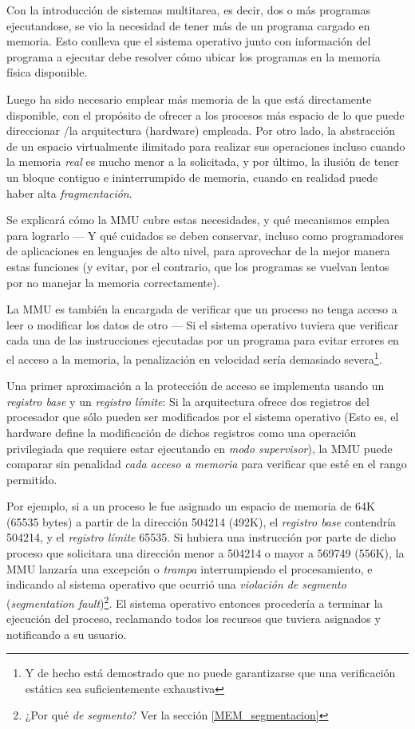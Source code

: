 \documentclass[11pt,fleqn]{book} %
\begin{document}
Con la introducción de sistemas multitarea, es decir, dos o más 
programas ejecutandose, se vio la necesidad de tener más de un
programa cargado en memoria. Esto conlleva que el sistema operativo
junto con información del programa a ejecutar debe resolver cómo
ubicar los programas en la memoria física disponible.

Luego ha sido necesario emplear más memoria de la que está directamente disponible, 
con el propósito de ofrecer a los procesos más espacio de lo que puede 
direccionar /la arquitectura (hardware) empleada. Por otro lado, 
la abstracción de un espacio virtualmente ilimitado para realizar sus
operaciones incluso cuando la memoria \emph{real} es mucho menor a la
solicitada, y por último, la ilusión de tener un bloque contiguo e
ininterrumpido de memoria, cuando en realidad puede haber alta
\emph{fragmentación}.

Se explicará cómo la MMU cubre estas necesidades, y qué mecanismos
emplea para lograrlo — Y qué cuidados se deben conservar, incluso como
programadores de aplicaciones en lenguajes de alto nivel, para aprovechar de la
mejor manera estas funciones (y evitar, por el contrario, que los
programas se vuelvan lentos por no manejar la memoria
correctamente).

La MMU es también la encargada de verificar que un proceso no tenga
acceso a leer o modificar los datos de otro — Si el sistema operativo
tuviera que verificar cada una de las instrucciones ejecutadas por
un programa para evitar errores en el acceso a la memoria, la 
penalización en velocidad sería demasiado severa\footnote{Y de hecho está 
demostrado que no puede garantizarse que una verificación estática sea
suficientemente exhaustiva }.

Una primer aproximación a la protección de acceso se implementa usando
un \emph{registro base} y un \emph{registro límite}: Si la arquitectura ofrece dos
registros del procesador que sólo pueden ser modificados por el
sistema operativo (Esto es, el hardware define la modificación de
dichos registros como una operación privilegiada que requiere estar
ejecutando en \emph{modo supervisor}), la MMU puede comparar sin penalidad \emph{cada  acceso a memoria} para verificar que esté en el rango permitido.

Por ejemplo, si a un proceso le fue asignado un espacio de memoria de
64K (65535 bytes) a partir de la dirección 504214 (492K), el \emph{registro base} contendría 504214, y el \emph{registro límite} 65535. Si hubiera una
instrucción por parte de dicho proceso que solicitara una dirección
menor a 504214 o mayor a 569749 (556K), la MMU lanzaría una excepción
o \emph{trampa} interrumpiendo el procesamiento, e indicando al sistema
operativo que ocurrió una \emph{violación de segmento} (\emph{segmentation fault})\footnote{¿Por qué \emph{de segmento}? Ver la sección \ref{MEM_segmentacion} }. El sistema operativo entonces
procedería a terminar la ejecución del proceso, reclamando todos los
recursos que tuviera asignados y notificando a su usuario.
\end{document}
